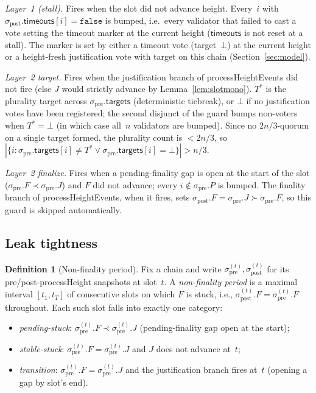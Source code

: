 \documentclass{article}
\newcommand{\targets}{\mathsf{targets}}
\newcommand{\timeouts}{\mathsf{timeouts}}
\newcommand{\processHeight}{\textsf{processHeight}\xspace}
\newcommand{\processHeightEvents}{\textsf{processHeightEvents}\xspace}
\theoremstyle{plain}
\theoremstyle{definition}
\newtheorem{definition}{Definition}
\theoremstyle{remark}
\begin{document}
\emph{Layer~1 (stall).} Fires when the slot did not advance height.
Every~$i$ with $\sigma_{\mathrm{post}}.\timeouts[i] = \mathtt{false}$ is bumped, i.e.\ every validator that failed to cast a vote setting the timeout marker at the current height ($\timeouts$ is not reset at a stall).
The marker is set by either a timeout vote (target~$\bot$) at the current height or a height-fresh justification vote with target on this chain (Section~\ref{sec:model}).

\emph{Layer~2 target.} Fires when the justification branch of \processHeightEvents did not fire (else $J$ would strictly advance by Lemma~\ref{lem:slotmono}).
$T^*$ is the plurality target across $\sigma_{\mathrm{pre}}.\targets$ (deterministic tiebreak), or $\bot$ if no justification votes have been registered; the second disjunct of the guard bumps non-voters when $T^* = \bot$ (in which case all~$n$ validators are bumped).
Since no $2n/3$-quorum on a single target formed, the plurality count is $< 2n/3$, so $|\{i : \sigma_{\mathrm{pre}}.\targets[i] \neq T^* \vee \sigma_{\mathrm{pre}}.\targets[i] = \bot\}| > n/3$.

\emph{Layer~2 finalize.} Fires when a pending-finality gap is open at the start of the slot ($\sigma_{\mathrm{pre}}.F \prec \sigma_{\mathrm{pre}}.J$) and $F$ did not advance; every $i \notin \sigma_{\mathrm{pre}}.P$ is bumped.
The finality branch of \processHeightEvents, when it fires, sets $\sigma_{\mathrm{post}}.F = \sigma_{\mathrm{pre}}.J \succ \sigma_{\mathrm{pre}}.F$, so this guard is skipped automatically.

\subsection{Leak tightness}

\begin{definition}[Non-finality period]\label{def:non-finality-period}
Fix a chain and write $\sigma_{\mathrm{pre}}^{(t)}, \sigma_{\mathrm{post}}^{(t)}$ for its pre/post-\processHeight snapshots at slot~$t$.
A \emph{non-finality period} is a maximal interval $[t_1, t_T]$ of consecutive slots on which $F$ is stuck, i.e., $\sigma_{\mathrm{post}}^{(t)}.F = \sigma_{\mathrm{pre}}^{(t)}.F$ throughout.
Each such slot falls into exactly one category:
\begin{itemize}
  \item \emph{pending-stuck}: $\sigma_{\mathrm{pre}}^{(t)}.F \prec \sigma_{\mathrm{pre}}^{(t)}.J$ (pending-finality gap open at the start);
  \item \emph{stable-stuck}: $\sigma_{\mathrm{pre}}^{(t)}.F = \sigma_{\mathrm{pre}}^{(t)}.J$ and $J$ does not advance at~$t$;
  \item \emph{transition}: $\sigma_{\mathrm{pre}}^{(t)}.F = \sigma_{\mathrm{pre}}^{(t)}.J$ and the justification branch fires at~$t$ (opening a gap by slot's end).
\end{itemize}
\end{definition}
\end{document}
